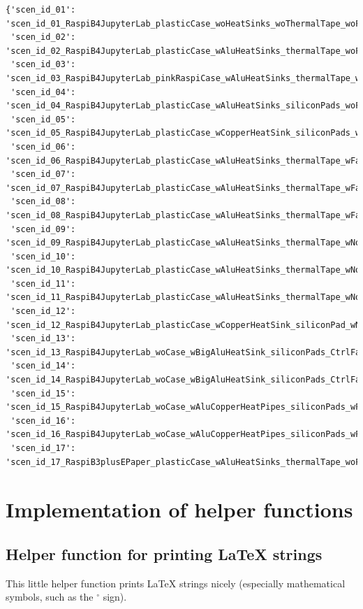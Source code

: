 \documentclass[10pt,parskip=half,
toc=sectionentrywithdots,
bibliography=totocnumbered,
captions=tableheading,numbers=noendperiod]{scrartcl}
\begin{document}
\begin{lstlisting}[language={},postbreak={},numbers=none,xrightmargin=7pt,breakindent=0pt,aboveskip=5pt,belowskip=5pt]
{'scen_id_01': 'scen_id_01_RaspiB4JupyterLab_plasticCase_woHeatSinks_woThermalTape_woFan',
 'scen_id_02': 'scen_id_02_RaspiB4JupyterLab_plasticCase_wAluHeatSinks_thermalTape_woFan',
 'scen_id_03': 'scen_id_03_RaspiB4JupyterLab_pinkRaspiCase_wAluHeatSinks_thermalTape_woFan',
 'scen_id_04': 'scen_id_04_RaspiB4JupyterLab_plasticCase_wAluHeatSinks_siliconPads_woFan',
 'scen_id_05': 'scen_id_05_RaspiB4JupyterLab_plasticCase_wCopperHeatSink_siliconPads_woFan',
 'scen_id_06': 'scen_id_06_RaspiB4JupyterLab_plasticCase_wAluHeatSinks_thermalTape_wFan5V',
 'scen_id_07': 'scen_id_07_RaspiB4JupyterLab_plasticCase_wAluHeatSinks_thermalTape_wFan5Vrev',
 'scen_id_08': 'scen_id_08_RaspiB4JupyterLab_plasticCase_wAluHeatSinks_thermalTape_wFan3V',
 'scen_id_09': 'scen_id_09_RaspiB4JupyterLab_plasticCase_wAluHeatSinks_thermalTape_wNoctuaFan5V',
 'scen_id_10': 'scen_id_10_RaspiB4JupyterLab_plasticCase_wAluHeatSinks_thermalTape_wNoctuaFan5Vrev',
 'scen_id_11': 'scen_id_11_RaspiB4JupyterLab_plasticCase_wAluHeatSinks_thermalTape_wNoctuaFan3V',
 'scen_id_12': 'scen_id_12_RaspiB4JupyterLab_plasticCase_wCopperHeatSink_siliconPad_wNoctuaFan3V',
 'scen_id_13': 'scen_id_13_RaspiB4JupyterLab_woCase_wBigAluHeatSink_siliconPads_CtrlFan70C',
 'scen_id_14': 'scen_id_14_RaspiB4JupyterLab_woCase_wBigAluHeatSink_siliconPads_CtrlFan65C',
 'scen_id_15': 'scen_id_15_RaspiB4JupyterLab_woCase_wAluCopperHeatPipes_siliconPads_wFan5V',
 'scen_id_16': 'scen_id_16_RaspiB4JupyterLab_woCase_wAluCopperHeatPipes_siliconPads_wFan3V',
 'scen_id_17': 'scen_id_17_RaspiB3plusEPaper_plasticCase_wAluHeatSinks_thermalTape_woFan'}
\end{lstlisting}

\hypertarget{implementation-of-helper-functions}{%
\section{Implementation of helper
functions}\label{implementation-of-helper-functions}}

\hypertarget{helper-function-for-printing-latex-strings}{%
\subsection{Helper function for printing LaTeX
strings}\label{helper-function-for-printing-latex-strings}}

This little helper function prints LaTeX strings nicely (especially
mathematical symbols, such as the \(^\circ\) sign).
\end{document}
